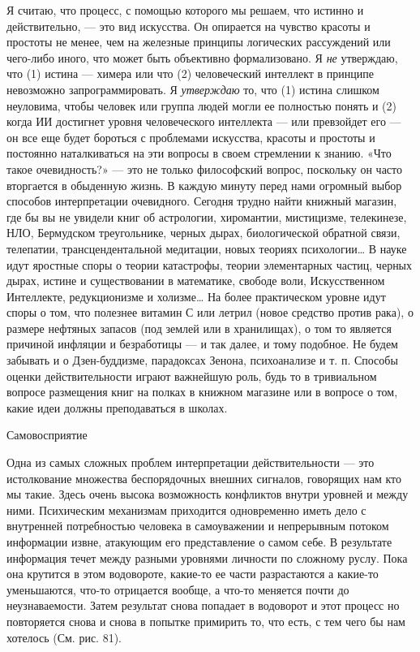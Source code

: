 \documentclass[../main.tex]{subfiles}
\begin{document}
Я считаю, что процесс, с помощью которого мы решаем, что истинно и действительно, --- это вид искусства. Он опирается на чувство красоты и простоты не менее, чем на железные принципы логических рассуждений или чего-либо иного, что может быть объективно формализовано. Я \emph{не} утверждаю, что (1) истина --- химера или что (2) человеческий интеллект в принципе невозможно запрограммировать. Я \emph{утверждаю} то, что (1) истина слишком неуловима, чтобы человек или группа людей могли ее полностью понять и (2) когда ИИ достигнет уровня человеческого интеллекта --- или превзойдет его --- он все еще будет бороться с проблемами искусства, красоты и простоты и постоянно наталкиваться на эти вопросы в своем стремлении к знанию. «Что такое очевидность?» --- это не только философский вопрос, поскольку он часто вторгается в обыденную жизнь. В каждую минуту перед нами огромный выбор способов интерпретации очевидного. Сегодня трудно найти книжный магазин, где бы вы не увидели книг об астрологии, хиромантии, мистицизме, телекинезе, НЛО, Бермудском треугольнике, черных дырах, биологической обратной связи, телепатии, трансцендентальной медитации, новых теориях психологии\ldots{} В науке идут яростные споры о теории катастрофы, теории элементарных частиц, черных дырах, истине и существовании в математике, свободе воли, Искусственном Интеллекте, редукционизме и холизме\ldots{} На более практическом уровне идут споры о том, что полезнее витамин С или летрил (новое средство против рака), о размере нефтяных запасов (под землей или в хранилищах), о том то является причиной инфляции и безработицы --- и так далее, и тому подобное. Не будем забывать и о Дзен-буддизме, парадоксах Зенона, психоанализе и т. п. Способы оценки действительности играют важнейшую роль, будь то в тривиальном вопросе размещения книг на полках в книжном магазине или в вопросе о том, какие идеи должны преподаваться в школах.

Самовосприятие

Одна из самых сложных проблем интерпретации действительности --- это истолкование множества беспорядочных внешних сигналов, говорящих нам кто мы такие. Здесь очень высока возможность конфликтов внутри уровней и между ними. Психическим механизмам приходится одновременно иметь дело с внутренней потребностью человека в самоуважении и непрерывным потоком информации извне, атакующим его представление о самом себе. В результате информация течет между разными уровнями личности по сложному руслу. Пока она крутится в этом водовороте, какие-то ее части разрастаются а какие-то уменьшаются, что-то отрицается вообще, а что-то меняется почти до неузнаваемости. Затем результат снова попадает в водоворот и этот процесс но повторяется снова и снова в попытке примирить то, что есть, с тем чего бы нам хотелось (См. рис. 81).
\end{document}
